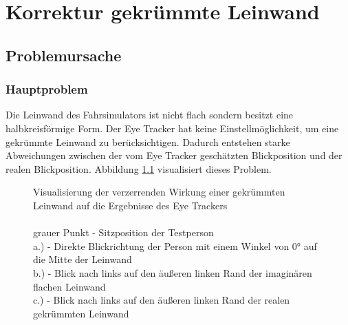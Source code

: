 \chapter{Korrektur gekrümmte Leinwand}
\label{sec:korrektur gekrümmte leinwand}

\section{Problemursache}
\subsection{Hauptproblem}
Die Leinwand des Fahrsimulators ist nicht flach sondern besitzt eine halbkreisförmige Form. Der Eye Tracker hat keine Einstellmöglichkeit, um eine gekrümmte Leinwand zu berücksichtigen. Dadurch entstehen starke Abweichungen zwischen der vom Eye Tracker geschätzten Blickposition und der realen Blickposition. Abbildung \ref{fig:kruemmungsproblem_1} visualisiert dieses Problem. 



\begin{figure}
	\begin{center}
		\caption{Visualisierung der verzerrenden Wirkung einer gekrümmten Leinwand auf die Ergebnisse des Eye Trackers\\\\
		\footnotesize grauer Punkt - Sitzposition der Testperson\\
		a.) - Direkte Blickrichtung der Person mit einem Winkel von 0° auf die Mitte der Leinwand\\
		b.) - Blick nach links auf den äußeren linken Rand der imaginären flachen Leinwand\\
		c.) - Blick nach links auf den äußeren linken Rand der realen gekrümmten Leinwand}
		 \label{fig:kruemmungsproblem_1}
	\end{center}
\end{figure}

